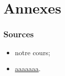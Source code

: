 
\part*{Annexes}


    \section*{Sources}
        \begin{itemize}
            \item notre cours;
            \item \url{aaaaaaa}.
        \end{itemize}

